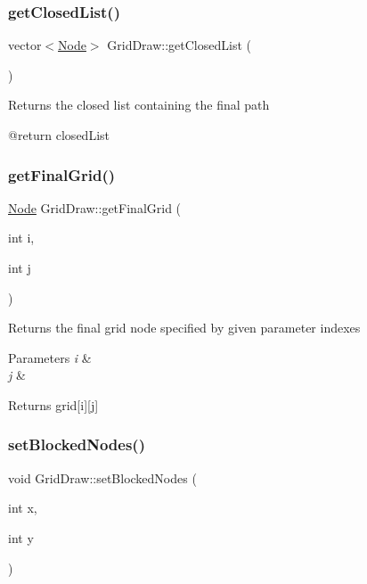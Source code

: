 \subsubsection{\texorpdfstring{get\+Closed\+List()}{getClosedList()}}
{\footnotesize\ttfamily vector$<$\hyperlink{structNode}{Node}$>$ Grid\+Draw\+::get\+Closed\+List (\begin{DoxyParamCaption}{ }\end{DoxyParamCaption})\hspace{0.3cm}{\ttfamily [inline]}}

Returns the closed list containing the final path \begin{DoxyVerb}@return closedList\end{DoxyVerb}
 \mbox{\label{classGridDraw_aa4c5ec7b24e2c2d0004bc22e7453f791}} 
\subsubsection{\texorpdfstring{get\+Final\+Grid()}{getFinalGrid()}}
{\footnotesize\ttfamily \hyperlink{structNode}{Node} Grid\+Draw\+::get\+Final\+Grid (\begin{DoxyParamCaption}\item[{int}]{i,  }\item[{int}]{j }\end{DoxyParamCaption})\hspace{0.3cm}{\ttfamily [inline]}}

Returns the final grid node specified by given parameter indexes


\begin{DoxyParams}{Parameters}
{\em i} & \\
\hline
{\em j} & \\
\hline
\end{DoxyParams}
\begin{DoxyReturn}{Returns}
grid\mbox{[}i\mbox{]}\mbox{[}j\mbox{]} 
\end{DoxyReturn}
\mbox{\label{classGridDraw_afa57a983e74b8bafa3b8f6f05c5455be}} 
\subsubsection{\texorpdfstring{set\+Blocked\+Nodes()}{setBlockedNodes()}}
{\footnotesize\ttfamily void Grid\+Draw\+::set\+Blocked\+Nodes (\begin{DoxyParamCaption}\item[{int}]{x,  }\item[{int}]{y }\end{DoxyParamCaption})\hspace{0.3cm}{\ttfamily [inline]}}

